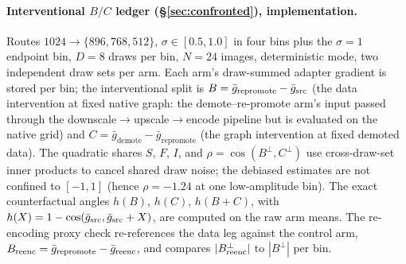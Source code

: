 \paragraph{Interventional $B/C$ ledger (\S\ref{sec:confronted}),
implementation.} Routes $1024{\to}\{896, 768, 512\}$,
$\sigma \in [0.5, 1.0]$ in four bins plus the $\sigma{=}1$ endpoint
bin, $D{=}8$ draws per bin, $N{=}24$ images, deterministic mode, two
independent draw sets per arm. Each arm's draw-summed adapter
gradient is stored per bin; the interventional split is
$B = \bar g_{\mathrm{repromote}} - \bar g_{\mathrm{src}}$ (the data
intervention at fixed native graph: the demote--re-promote arm's
input passed through the downscale$\to$upscale$\to$encode pipeline
but is evaluated on the native grid) and
$C = \bar g_{\mathrm{demote}} - \bar g_{\mathrm{repromote}}$ (the
graph intervention at fixed demoted data). The quadratic shares $S$,
$F$, $I$, and $\rho = \cos(B^{\perp}, C^{\perp})$ use cross-draw-set
inner products to cancel shared draw noise; the debiased estimates
are not confined to $[-1, 1]$ (hence $\rho = -1.24$ at one
low-amplitude bin). The exact counterfactual angles $h(B)$, $h(C)$,
$h(B{+}C)$, with
$h(X) = 1 - \cos(\bar g_{\mathrm{src}}, \bar g_{\mathrm{src}} + X)$, are computed on
the raw arm means. The re-encoding proxy check re-references the data
leg against the control arm,
$B_{\mathrm{reenc}} = \bar g_{\mathrm{repromote}} - \bar g_{\mathrm{reenc}}$, and
compares $|B^{\perp}_{\mathrm{reenc}}|$ to $|B^{\perp}|$ per bin.

